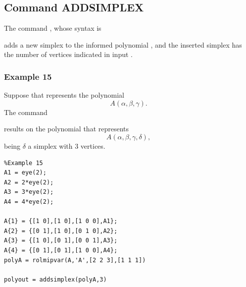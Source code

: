 \documentclass[english,11pt]{article}
\theoremstyle{break} \theorembodyfont{\small\rm}
\begin{document}
\subsection*{Command ADDSIMPLEX}

The command , whose syntax is

\vspace{0.5cm}%
\begin{minipage}{8.5cm}
\end{minipage}
\vspace{0.2cm}

\noindent adds a new simplex to the informed polynomial , and the inserted
simplex has the number of vertices indicated in input .

\subsubsection*{Example 15}

Suppose that  represents the polynomial
\[
 A(\alpha,\beta,\gamma).
\]
The command

\vspace{0.5cm}%
\begin{minipage}{8.5cm}
\end{minipage}
\vspace{0.2cm}

\noindent results on the polynomial 
that represents
\[
 A(\alpha,\beta,\gamma,\delta),
\]
being $\delta$ a simplex with $3$ vertices.

\begin{minipage}{9.5cm}
 \begin{lstlisting}
%Example 15
A1 = eye(2);
A2 = 2*eye(2);
A3 = 3*eye(2);
A4 = 4*eye(2);

A{1} = {[1 0],[1 0],[1 0 0],A1};
A{2} = {[0 1],[1 0],[0 1 0],A2};
A{3} = {[1 0],[0 1],[0 0 1],A3};
A{4} = {[0 1],[0 1],[1 0 0],A4};
polyA = rolmipvar(A,'A',[2 2 3],[1 1 1])

polyout = addsimplex(polyA,3)
 \end{lstlisting}
\end{minipage}
\vspace{0.2cm}
\end{document}
